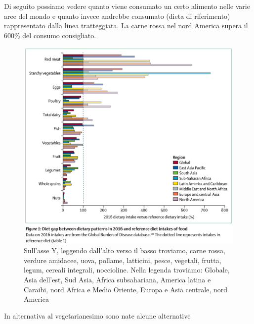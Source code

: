 \documentclass[12pt]{book} %
\begin{document}
\needspace{4cm}
Di seguito possiamo vedere quanto viene consumato un certo alimento nelle varie aree del mondo e quanto invece andrebbe
consumato (dieta di riferimento) rappresentato dalla linea
tratteggiata. La carne rossa nel nord America supera il 600\% del consumo consigliato.

\begin{figure}[H]
  \begin{minipage}{17cm}
    \includegraphics[width=17cm]{images/Libro-img023.png}
    \caption{Sull'asse Y, leggendo dall'alto verso il basso troviamo, carne rossa, verdure
amidacee, uova, pollame, latticini, pesce, vegetali, frutta, legum, cereali integrali, noccioline. 
Nella legenda troviamo: Globale, Asia dell'est, Sud Asia, Africa subsahariana, America latina e Caraibi, nord Africa e Medio Oriente, Europa e Asia centrale, nord America }
  \end{minipage}
\end{figure}

In alternativa al vegetarianesimo sono nate alcune alternative
\end{document}
